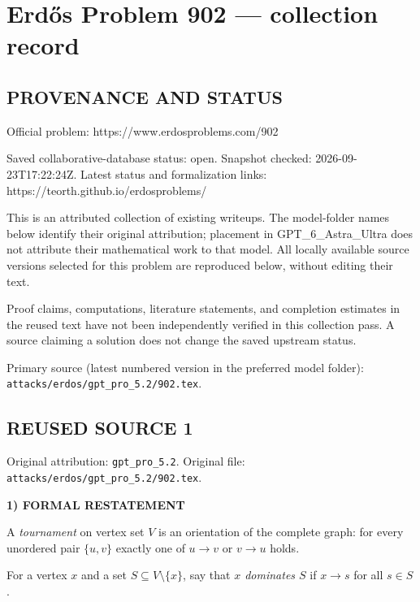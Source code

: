 \section*{Erd\H{o}s Problem 902 --- collection record}

\subsection*{PROVENANCE AND STATUS}
Official problem: https://www.erdosproblems.com/902

Saved collaborative-database status: open.
Snapshot checked: 2026-09-23T17:22:24Z.
Latest status and formalization links: https://teorth.github.io/erdosproblems/

This is an attributed collection of existing writeups. The model-folder names below identify their original attribution; placement in GPT\_6\_Astra\_Ultra does not attribute their mathematical work to that model. All locally available source versions selected for this problem are reproduced below, without editing their text.

Proof claims, computations, literature statements, and completion estimates in the reused text have not been independently verified in this collection pass. A source claiming a solution does not change the saved upstream status.

Primary source (latest numbered version in the preferred model folder): \texttt{attacks/erdos/gpt\_pro\_5.2/902.tex}.

\subsection*{REUSED SOURCE 1}
Original attribution: \texttt{gpt\_pro\_5.2}.
Original file: \texttt{attacks/erdos/gpt\_pro\_5.2/902.tex}.



\noindent\textbf{1) FORMAL RESTATEMENT}

A \emph{tournament} on vertex set $V$ is an orientation of the complete graph:
for every unordered pair $\{u,v\}$ exactly one of $u\to v$ or $v\to u$ holds.

For a vertex $x$ and a set $S\subseteq V\setminus\{x\}$, say that \emph{$x$
dominates $S$} if $x\to s$ for all $s\in S$.

